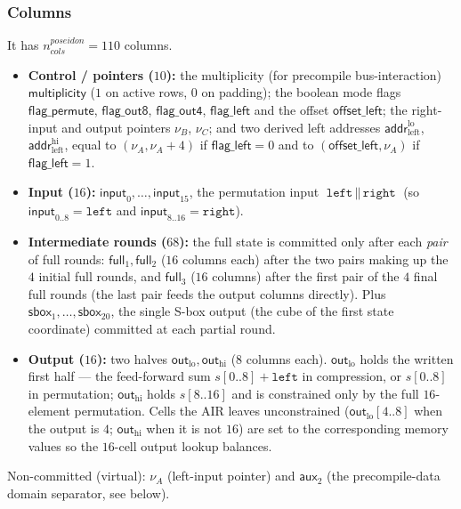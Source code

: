 \documentclass{article}
\theoremstyle{definition}
\begin{document}
\subsubsection{Columns}

It has $n_{cols}^{poseidon} = 110$ columns.

\begin{itemize}
    \item \textbf{Control / pointers ($10$):} the multiplicity (for precompile bus-interaction) $\textsf{multiplicity}$ ($1$ on active rows, $0$ on padding); the boolean mode flags $\textsf{flag\_permute}$, $\textsf{flag\_out8}$, $\textsf{flag\_out4}$, $\textsf{flag\_left}$ and the offset $\textsf{offset\_left}$; the right-input and output pointers $\nu_B$, $\nu_C$; and two derived left addresses $\textsf{addr}^\text{lo}_\text{left}$, $\textsf{addr}^\text{hi}_\text{left}$, equal to $(\nu_A, \nu_A{+}4)$ if $\textsf{flag\_left}{=}0$ and to $(\textsf{offset\_left}, \nu_A)$ if $\textsf{flag\_left}{=}1$.
    \item \textbf{Input ($16$):} $\textsf{input}_0, \ldots, \textsf{input}_{15}$, the permutation input $\texttt{left} \,\|\, \texttt{right}$ (so $\textsf{input}_{0..8} = \texttt{left}$ and $\textsf{input}_{8..16} = \texttt{right}$).
    \item \textbf{Intermediate rounds ($68$):} the full state is committed only after each \emph{pair} of full rounds: $\textsf{full}_1, \textsf{full}_2$ ($16$ columns each) after the two pairs making up the $4$ initial full rounds, and $\textsf{full}_3$ ($16$ columns) after the first pair of the $4$ final full rounds (the last pair feeds the output columns directly). Plus $\textsf{sbox}_1, \ldots, \textsf{sbox}_{20}$, the single S-box output (the cube of the first state coordinate) committed at each partial round.
    \item \textbf{Output ($16$):} two halves $\textsf{out}_\text{lo}, \textsf{out}_\text{hi}$ ($8$ columns each). $\textsf{out}_\text{lo}$ holds the written first half — the feed-forward sum $s[0..8] + \texttt{left}$ in compression, or $s[0..8]$ in permutation; $\textsf{out}_\text{hi}$ holds $s[8..16]$ and is constrained only by the full $16$-element permutation. Cells the AIR leaves unconstrained ($\textsf{out}_\text{lo}[4..8]$ when the output is $4$; $\textsf{out}_\text{hi}$ when it is not $16$) are set to the corresponding memory values so the $16$-cell output lookup balances.
\end{itemize}

Non-committed (virtual): $\nu_A$ (left-input pointer) and $\textsf{aux}_2$ (the precompile-data domain separator, see below).
\end{document}
